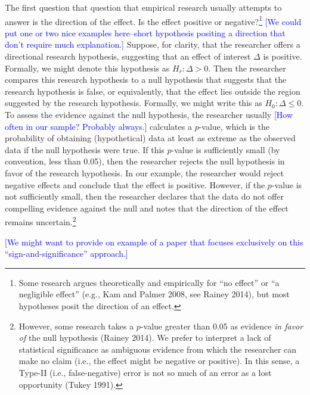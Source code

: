 \documentclass[12pt]{article}
\newcommand{\kelly}[1]{\textcolor{blue}{#1}}
\begin{document}
The first question that question that empirical research usually attempts to answer is the direction of the effect. Is the effect positive or negative?\footnote{Some research argues theoretically and empirically for ``no effect'' or ``a negligible effect'' (e.g., Kam and Palmer 2008, see Rainey 2014), but most hypotheses posit the direction of an effect.} \kelly{[We could put one or two nice examples here--short hypothesis positing a direction that don't require much explanation.]} Suppose, for clarity, that the researcher offers a directional research hypothesis, suggesting that an effect of interest $\Delta$ is positive. Formally, we might denote this hypothesis as $H_r: \Delta > 0$. Then the researcher compares this research hypothesis to a null hypothesis that suggests that the research hypothesis is false, or equivalently, that the effect lies outside the region suggested by the research hypothesis. Formally, we might write this as $H_0: \Delta \leq 0$. To assess the evidence against the null hypothesis, the researcher usually \kelly{[How often in our sample? Probably always.]} calculates a $p$-value, which is the probability of obtaining (hypothetical) data at least as extreme as the observed data if the null hypothesis were true. If this $p$-value is sufficiently small (by convention, less than 0.05), then the researcher rejects the null hypothesis in favor of the research hypothesis. In our example, the researcher would reject negative effects and conclude that the effect is positive. However, if the $p$-value is not sufficiently small, then the researcher declares that the data do not offer compelling evidence against the null and notes that the direction of the effect remains uncertain.\footnote{However, some research takes a $p$-value greater than 0.05 as evidence \textit{in favor of} the null hypothesis (Rainey 2014). We prefer to interpret a lack of statistical significance as ambiguous evidence from which the researcher can make no claim (i.e., the effect might be negative or positive). In this sense, a Type-II (i.e., false-negative) error is not so much of an error as a lost opportunity (Tukey 1991).}

\kelly{[We might want to provide on example of a paper that focuses exclusively on this ``sign-and-significance'' approach.]}
\end{document}
